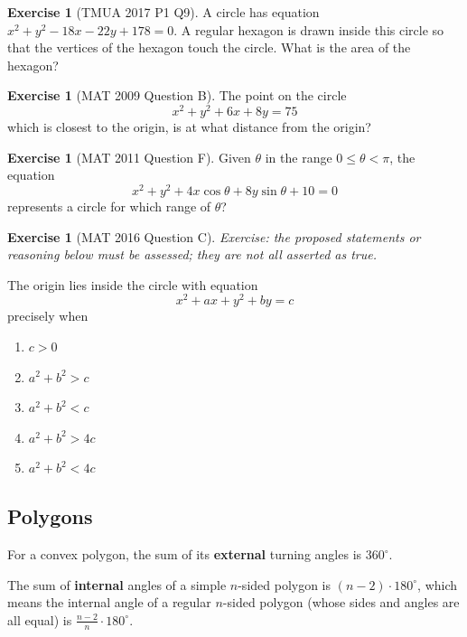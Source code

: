 \documentclass[11pt]{article}
\theoremstyle{definition}
\newtheorem{example}[theorem]{Exercise}
\theoremstyle{remark}
\newcommand{\pqty}[1]{\left(#1\right)}
\newcommand{\degree}{^{\circ}}
\begin{document}
\begin{example}[TMUA 2017 P1 Q9]\label{tmua-3-unit-017}
    A circle has equation \(x^2 + y^2 - 18 x - 22 y + 178 = 0\). A regular hexagon is drawn inside this circle so that the vertices of the hexagon touch the circle. What is the area of the hexagon?
\end{example}

\begin{example}[MAT 2009 Question B]\label{tmua-3-unit-018}
    The point on the circle
    \[
        x^2 + y^2 + 6x + 8y = 75
    \]
    which is closest to the origin, is at what distance from the origin?
\end{example}

\begin{example}[MAT 2011 Question F]\label{tmua-3-unit-019}
    Given \(\theta\) in the range \(0 \leq \theta < \pi\), the equation
    \[
        x^2 + y^2 + 4x \cos \theta + 8y \sin \theta + 10 = 0
    \]
    represents a circle for which range of \(\theta\)?
\end{example}

\begin{example}[MAT 2016 Question C]\label{tmua-3-unit-020}
\textit{Exercise: the proposed statements or reasoning below must be assessed; they are not all asserted as true.}\par

    The origin lies inside the circle with equation
    \[
        x^2 + ax + y^2 + by = c
    \]
    precisely when
    \begin{enumerate}[label=(\alph*)]
        \item \(c > 0\)
        \item \(a^2 + b^2 > c\)
        \item \(a^2 + b^2 < c\)
        \item \(a^2 + b^2 > 4c\)
        \item \(a^2 + b^2 < 4c\)
    \end{enumerate}
\end{example}

\subsection{Polygons}\label{tmua-3-subsection-010}

For a convex polygon, the sum of its \textbf{external} turning angles is \(360 \degree\).

The sum of \textbf{internal} angles of a simple \(n\)-sided polygon is \(\pqty{n - 2} \cdot 180 \degree\), which means the internal angle of a regular \(n\)-sided polygon (whose sides and angles are all equal) is \(\frac{n - 2}{n} \cdot 180 \degree\).
\end{document}
